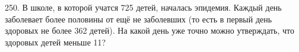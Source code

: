 250. В школе, в которой учатся 725 детей, началась эпидемия. Каждый день заболевает более половины от ещё не заболевших (то есть в первый день здоровых не более 362 детей). На какой день уже точно можно утверждать, что здоровых детей меньше 11?\\
